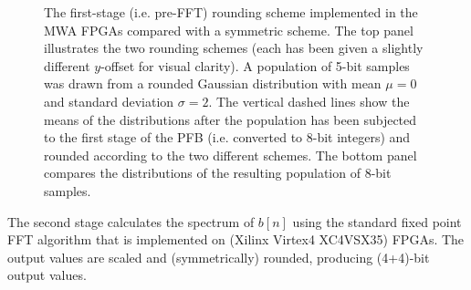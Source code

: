 \documentclass{pasa}%
\begin{document}
\begin{appendix}
\begin{figure}[t!]
    \caption{The first-stage (i.e. pre-FFT) rounding scheme implemented in the MWA FPGAs compared with a symmetric scheme. The top panel illustrates the two rounding schemes (each has been given a slightly different $y$-offset for visual clarity). A population of 5-bit samples was drawn from a rounded Gaussian distribution with mean $\mu = 0$ and standard deviation $\sigma = 2$. The vertical dashed lines show the means of the distributions after the population has been subjected to the first stage of the PFB (i.e. converted to 8-bit integers) and rounded according to the two different schemes. The bottom panel compares the distributions of the resulting population of 8-bit samples.}
    \label{fig:pre_fft_distributions}
\end{figure}

The second stage calculates the spectrum of $b[n]$ using the standard fixed point FFT algorithm that is implemented on (Xilinx Virtex4 XC4VSX35) FPGAs.
The output values are scaled and (symmetrically) rounded, producing (4+4)-bit output values.

\end{appendix}



\end{document}

